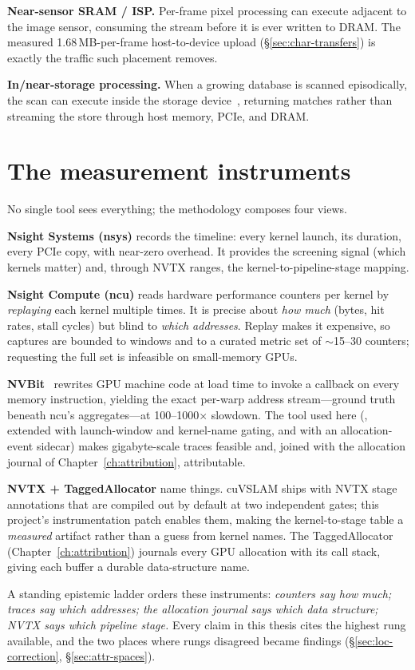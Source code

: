 \textbf{Near-sensor SRAM / ISP.} Per-frame pixel processing can execute
adjacent to the image sensor, consuming the stream before it is ever written
to DRAM. The measured 1.68\,MB-per-frame host-to-device upload
(\S\ref{sec:char-transfers}) is exactly the traffic such placement removes.

\textbf{In/near-storage processing.} When a growing database is scanned
episodically, the scan can execute inside the storage
device~\cite{do2013smartssd,gu2016biscuit}, returning matches rather than
streaming the store through host memory, PCIe, and DRAM.

\section{The measurement instruments}
\label{sec:bg-tools}

No single tool sees everything; the methodology composes four views.

\textbf{Nsight Systems (nsys)} records the timeline: every kernel launch,
its duration, every PCIe copy, with near-zero overhead. It provides the
screening signal (which kernels matter) and, through NVTX ranges, the
kernel-to-pipeline-stage mapping.

\textbf{Nsight Compute (ncu)} reads hardware performance counters per kernel
by \emph{replaying} each kernel multiple times. It is precise about
\emph{how much} (bytes, hit rates, stall cycles) but blind to \emph{which
addresses}. Replay makes it expensive, so captures are bounded to windows
and to a curated metric set of $\sim$15--30 counters; requesting the full
set is infeasible on small-memory GPUs.

\textbf{NVBit}~\cite{villa2019nvbit} rewrites GPU machine code at load time
to invoke a callback on every memory instruction, yielding the exact
per-warp address stream---ground truth beneath ncu's aggregates---at
100--1000$\times$ slowdown. The tool used here (, extended
with launch-window and kernel-name gating, and with an allocation-event
sidecar) makes gigabyte-scale traces feasible and, joined with the
allocation journal of Chapter~\ref{ch:attribution}, attributable.

\textbf{NVTX + TaggedAllocator} name things. cuVSLAM ships with NVTX stage
annotations that are compiled out by default at two independent gates; this
project's instrumentation patch enables them, making the kernel-to-stage
table a \emph{measured} artifact rather than a guess from kernel names. The
TaggedAllocator (Chapter~\ref{ch:attribution}) journals every GPU allocation
with its call stack, giving each buffer a durable data-structure name.

A standing epistemic ladder orders these instruments: \emph{counters say how
much; traces say which addresses; the allocation journal says which data
structure; NVTX says which pipeline stage.} Every claim in this thesis cites
the highest rung available, and the two places where rungs disagreed became
findings (\S\ref{sec:loc-correction}, \S\ref{sec:attr-spaces}).
